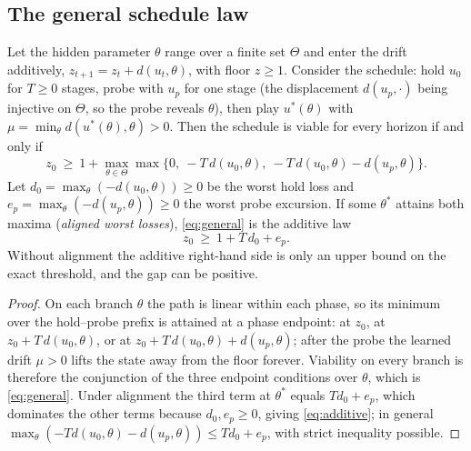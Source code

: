 \subsection{The general schedule law}

\begin{theorem}\label{thm:additive}
Let the hidden parameter $\theta$ range over a finite set $\Theta$ and enter the drift additively, $z_{t+1}=z_t+d(u_t,\theta)$, with floor $z\ge1$. Consider the schedule: hold $u_0$ for $T\ge0$ stages, probe with $u_p$ for one stage (the displacement $d(u_p,\cdot)$ being injective on $\Theta$, so the probe reveals $\theta$), then play $u^{*}(\theta)$ with $\mu=\min_{\theta}d(u^{*}(\theta),\theta)>0$. Then the schedule is viable for every horizon if and only if
\begin{equation}\label{eq:general}
z_0\ \ge\ 1+\max_{\theta\in\Theta}\max\bigl\{0,\ -T\,d(u_0,\theta),\ -T\,d(u_0,\theta)-d(u_p,\theta)\bigr\}.
\end{equation}
Let $d_0=\max_\theta(-d(u_0,\theta))\ge0$ be the worst hold loss and $e_p=\max_\theta(-d(u_p,\theta))\ge0$ the worst probe excursion. If some $\theta^{*}$ attains both maxima (\emph{aligned worst losses}), \eqref{eq:general} is the additive law
\begin{equation}\label{eq:additive}
z_0\ \ge\ 1+T\,d_0+e_p .
\end{equation}
Without alignment the additive right-hand side is only an upper bound on the exact threshold, and the gap can be positive.
\end{theorem}

\begin{proof}
On each branch $\theta$ the path is linear within each phase, so its minimum over the hold--probe prefix is attained at a phase endpoint: at $z_0$, at $z_0+T\,d(u_0,\theta)$, or at $z_0+T\,d(u_0,\theta)+d(u_p,\theta)$; after the probe the learned drift $\mu>0$ lifts the state away from the floor forever. Viability on every branch is therefore the conjunction of the three endpoint conditions over $\theta$, which is \eqref{eq:general}. Under alignment the third term at $\theta^{*}$ equals $T d_0+e_p$, which dominates the other terms because $d_0,e_p\ge0$, giving \eqref{eq:additive}; in general $\max_\theta(-Td(u_0,\theta)-d(u_p,\theta))\le Td_0+e_p$, with strict inequality possible.
\end{proof}

